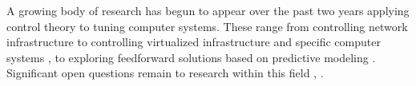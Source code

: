 A growing body of research has begun to appear over the past two years applying control theory to tuning computer systems.  These range from controlling network infrastructure \cite{ctrl:ariba-GL:2009} to controlling virtualized infrastructure and specific computer systems \cite{ctrl:wang-cgswrzh:2009}, \cite{ctrl:kjaer-kr:2009} to exploring feedforward solutions based on predictive modeling \cite{ctrl:abdelwahed-bsk:2009}.  Significant open questions remain to research within this field \cite{ctrl:Zhu:2009:CTB:1496909.1496922}, \cite{ctrl:hellerstein-sw:2009}.
